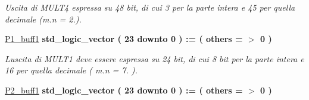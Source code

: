 \begin{DoxyCompactItemize}
\begin{DoxyCompactList}\small\item\em Uscita di M\+U\+L\+T4 espressa su 48 bit, di cui 3 per la parte intera e 45 per quella decimale (m.\+n = 2.). \end{DoxyCompactList}\item 
\hyperlink{group___linear_regression_gaa62b4451249556c1f9acb08b9bb1ba81}{P1\+\_\+buff1} {\bfseries \textcolor{vhdlchar}{std\+\_\+logic\+\_\+vector}\textcolor{vhdlchar}{ }\textcolor{vhdlchar}{(}\textcolor{vhdlchar}{ }\textcolor{vhdlchar}{ } \textcolor{vhdldigit}{23} \textcolor{vhdlchar}{ }\textcolor{vhdlchar}{downto}\textcolor{vhdlchar}{ }\textcolor{vhdlchar}{ } \textcolor{vhdldigit}{0} \textcolor{vhdlchar}{ }\textcolor{vhdlchar}{)}\textcolor{vhdlchar}{ }\textcolor{vhdlchar}{ }\textcolor{vhdlchar}{ }\textcolor{vhdlchar}{\+:}\textcolor{vhdlchar}{=}\textcolor{vhdlchar}{ }\textcolor{vhdlchar}{(}\textcolor{vhdlchar}{ }\textcolor{vhdlchar}{ }\textcolor{vhdlchar}{others}\textcolor{vhdlchar}{ }\textcolor{vhdlchar}{ }\textcolor{vhdlchar}{=}\textcolor{vhdlchar}{ }\textcolor{vhdlchar}{$>$}\textcolor{vhdlchar}{ }\textcolor{vhdlchar}{\textquotesingle{}}\textcolor{vhdlchar}{ } \textcolor{vhdldigit}{0} \textcolor{vhdlchar}{ }\textcolor{vhdlchar}{\textquotesingle{}}\textcolor{vhdlchar}{ }\textcolor{vhdlchar}{)}\textcolor{vhdlchar}{ }} 
\begin{DoxyCompactList}\small\item\em L\textquotesingle{}uscita di M\+U\+L\+T1 deve essere espressa su 24 bit, di cui 8 bit per la parte intera e 16 per quella decimale ( m.\+n = 7. ). \end{DoxyCompactList}\item 
\hyperlink{group___linear_regression_ga8f8c92d3996ed1be653d65bfa9a063da}{P2\+\_\+buff1} {\bfseries \textcolor{vhdlchar}{std\+\_\+logic\+\_\+vector}\textcolor{vhdlchar}{ }\textcolor{vhdlchar}{(}\textcolor{vhdlchar}{ }\textcolor{vhdlchar}{ } \textcolor{vhdldigit}{23} \textcolor{vhdlchar}{ }\textcolor{vhdlchar}{downto}\textcolor{vhdlchar}{ }\textcolor{vhdlchar}{ } \textcolor{vhdldigit}{0} \textcolor{vhdlchar}{ }\textcolor{vhdlchar}{)}\textcolor{vhdlchar}{ }\textcolor{vhdlchar}{ }\textcolor{vhdlchar}{ }\textcolor{vhdlchar}{\+:}\textcolor{vhdlchar}{=}\textcolor{vhdlchar}{ }\textcolor{vhdlchar}{(}\textcolor{vhdlchar}{ }\textcolor{vhdlchar}{ }\textcolor{vhdlchar}{others}\textcolor{vhdlchar}{ }\textcolor{vhdlchar}{ }\textcolor{vhdlchar}{=}\textcolor{vhdlchar}{ }\textcolor{vhdlchar}{$>$}\textcolor{vhdlchar}{ }\textcolor{vhdlchar}{\textquotesingle{}}\textcolor{vhdlchar}{ } \textcolor{vhdldigit}{0} \textcolor{vhdlchar}{ }\textcolor{vhdlchar}{\textquotesingle{}}\textcolor{vhdlchar}{ }\textcolor{vhdlchar}{)}\textcolor{vhdlchar}{ }} 

\end{DoxyCompactItemize}
